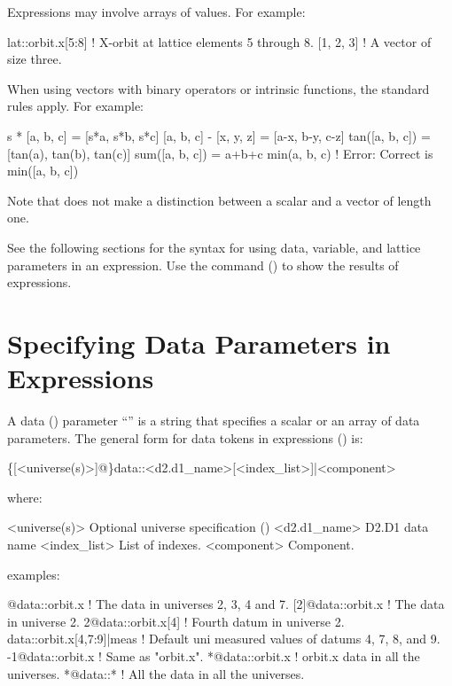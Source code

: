 Expressions may involve arrays of values. For example:
\begin{example}
  lat::orbit.x[5:8]     ! X-orbit at lattice elements 5 through 8.
  [1, 2, 3]             ! A vector of size three.
\end{example}
When using vectors with binary operators or intrinsic functions, the standard rules apply. For example:
\begin{example}
  s * [a, b, c]         = [s*a, s*b, s*c]
  [a, b, c] - [x, y, z] = [a-x, b-y, c-z]
  tan([a, b, c])        = [tan(a), tan(b), tan(c)]
  sum([a, b, c])        = a+b+c
  min(a, b, c)          ! Error: Correct is min([a, b, c])
\end{example}
Note that \tao does not make a distinction between a scalar and a vector of length one.

See the following sections for the syntax for using data, variable, and lattice parameters in an
expression. Use the  command () to show the results of expressions.

\section{Specifying Data Parameters in Expressions}
\label{s:data.token}

A data () parameter ``'' is a string that specifies a scalar or an array
of data parameters.  The general form for data tokens in expressions () is:
\begin{example}
  \{[<universe(s)>]@\}data::<d2.d1_name>[<index_list>]|<component>
\end{example}
where:
\begin{example}
  <universe(s)>       Optional universe specification ()
  <d2.d1_name>        D2.D1 data name
  <index_list>        List of indexes.
  <component>         Component. 
\end{example}
examples:
\begin{example}
  [2:4,7]@data::orbit.x      ! The  data in universes 2, 3, 4 and 7.
  [2]@data::orbit.x          ! The  data in universe 2. 
  2@data::orbit.x[4]         ! Fourth  datum in universe 2.
  data::orbit.x[4,7:9]|meas  ! Default uni measured values of datums 4, 7, 8, and 9.
  -1@data::orbit.x           ! Same as "orbit.x".
  *@data::orbit.x            ! orbit.x data in all the universes.
  *@data::*                  ! All the data in all the universes.
\end{example}

